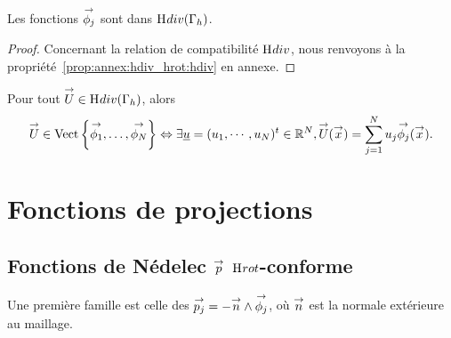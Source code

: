     \begin{prop}
      Les fonctions \(\phij\) sont dans \(\Hdiv(\Gamma_h)\).
    \end{prop}
    \begin{proof}
      Concernant la relation de compatibilité \(\Hdiv\), nous renvoyons à la propriété~\ref{prop:annex:hdiv_hrot:hdiv} en annexe.
    \end{proof}

    \begin{defn}
      Pour tout \(\vect{U} \in \Hdiv(\Gamma_h)\), alors
      \begin{equation*}
        \vect{U} \in \Vect{\vect{\phi_1},\ldots,\vect{\phi_N}} \Leftrightarrow \exists \comp{u} = (u_1,\cdots,u_N)^t \in \RR^N, \vect{U}(\vx) = \sum_{j=1}^N u_j \phij(\vx).
      \end{equation*}
    \end{defn}

\section{Fonctions de projections}


  \subsection[Fonctions de Nédélec p Hrot-conforme]{Fonctions de Nédelec \(\vect{p}\) \(\Hrot\)-conforme}

    Une première famille est celle des \(\pj=-\vn\pvect\phij\), où \(\vn\) est la normale extérieure au maillage. 

